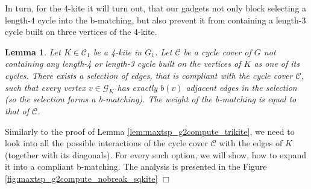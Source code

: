 \documentclass[a4, 11pt]{article}
\newcommand{\dowod}{\noindent{\bf Proof.~}}
\newcommand{\koniec}{\hfill $\Box$\\[.1ex]}
\newcommand{\<}{\langle}
\renewcommand{\>}{\rangle}
\newtheorem{lemma}{Lemma}
\begin{document}
  In turn, for the 4-kite it will turn out, that our gadgets not only block
  selecting a length-4 cycle into the b-matching, but also prevent it from
  containing a length-3 cycle built on three vertices of the 4-kite.
  \begin{lemma}
    \label{lem:maxtsp_g2compute_nobreak_sqkite}
    Let $K \in \mathcal{C}_1$ be a 4-kite in $G_1$. Let $\mathcal{C}$ be a cycle cover of $G$ not containing any length-4 or length-3 cycle built on the vertices of $K$ as one of its cycles. There exists a selection of edges, that is compliant with the cycle cover $\mathcal{C}$, such that every vertex $v \in \mathcal{G}_K$ has exactly $b(v)$ adjacent edges in the selection (so the selection forms a b-matching). The weight of the b-matching is equal to that of $\mathcal{C}$.
  \end{lemma}
  \dowod
    Similarly to the proof of Lemma \ref{lem:maxtsp_g2compute_trikite}, we
    need to look into all the possible interactions of the cycle cover
    $\mathcal{C}$ with the edges of $K$ (together with its diagonals). For every
    such option, we will show, how to expand it into a compliant b-matching. The
    analysis is presented in the
    Figure \ref{fig:maxtsp_g2compute_nobreak_sqkite}
  \koniec
\end{document}
